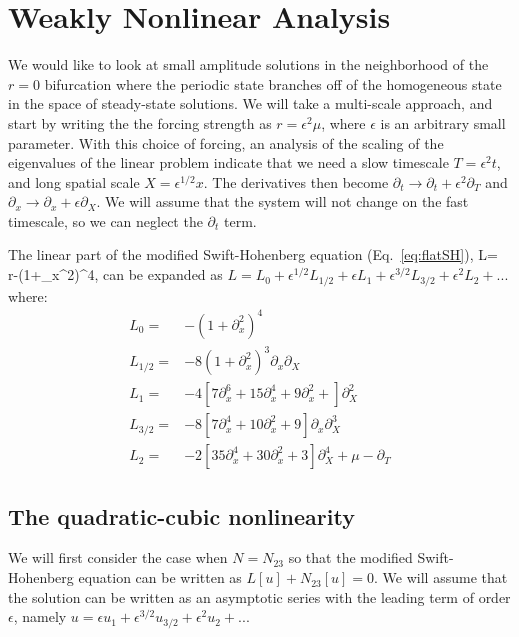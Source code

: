 \documentclass[../main/FlatMarginalStability.tex]{subfiles}
\begin{document}
\section{Weakly Nonlinear Analysis}
We would like to look at small amplitude solutions in the neighborhood of the $r=0$ bifurcation where the periodic state branches off of the homogeneous state in the space of steady-state solutions.  We will take a multi-scale approach, and start by writing the the forcing strength as $r=\epsilon^2 \mu$, where $\epsilon$ is an arbitrary small parameter.  With this choice of forcing, an analysis of the scaling of the eigenvalues of the linear problem indicate that we need a slow timescale $T=\epsilon^2 t$, and long spatial scale $X=\epsilon^{1/2} x$.   The derivatives then become $\partial_t \rightarrow \partial_t+\epsilon^2\partial_T$ and $\partial_x \rightarrow \partial_x+\epsilon\partial_X$.  We will assume that the system will not change on the fast timescale, so we can neglect the $\partial_t$ term. 

The linear part of the modified Swift-Hohenberg equation (Eq.~\ref{eq:flatSH}), 
\beqn
L= r-\left(1+\partial_{x}^2\right)^4,
\eeqn
can be expanded as $L=L_0+\epsilon^{1/2} L_{1/2}+\epsilon L_1+\epsilon^{3/2} L_{3/2}+\epsilon^2 L_2+...$ where:
\begin{subequations}
\begin{align}
L_0 =& -\left(1+\partial_x^2\right)^4  \\
L_{1/2} =& -8\left(1+\partial_x^2\right)^3 \partial_x\partial_X \\
L_1 =&- 4 \left[7 \partial_x^6+15\partial_x^4+9 \partial_x^2+\right] \partial_X^2\\  
L_{3/2} =& -8   \left[ 7 \partial_x^4+10  \partial_x^2+9\right]\partial_x \partial_X^3 \\
L_2 =& -2\left[ 35 \partial_x^4+30 \partial_x^2 +3\right]\partial_X^4+\mu-\partial_T  %
\end{align}
\end{subequations}

\subsection{The quadratic-cubic nonlinearity}
We will first consider the case when $N=N_{23}$ so that the modified Swift-Hohenberg equation can be written as $L[u]+N_{23}[u]=0$.  We will assume that the solution can be written as an asymptotic series with the leading term of order $\epsilon$, namely $u=\epsilon u_1 + \epsilon^{3/2} u_{3/2} +\epsilon^2 u_2+...$ 
\end{document}

